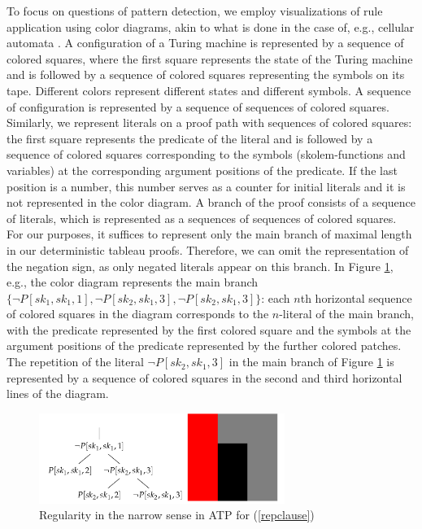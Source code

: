 \documentclass[%
  manuscript=article,   %
  year=2024,
  volume=77,
  doi=00000.000,
]{zfn}
\begin{document}
To focus on questions of pattern detection, we employ visualizations of rule application using color diagrams, akin to what is done in the case of, e.g., cellular automata \parencite[cf.][]{Wolfram}. 
A configuration of a Turing machine is represented by a sequence of colored squares, where the first square represents the state of the Turing machine and is followed by a sequence of colored squares representing the symbols on its tape. Different colors represent different states and different symbols. A sequence of configuration is represented by a sequence of sequences of colored squares. Similarly, we represent literals on a proof path with sequences of colored squares: the first square represents \label{colordia} the predicate of the literal and is followed by a sequence of colored squares corresponding to the symbols (skolem-functions and variables) at the corresponding argument positions of the predicate. If the last position is a number, this number serves as a counter for initial literals and it is not represented in the color diagram. A branch of the proof consists of a sequence of literals, which is represented as a sequences of sequences of colored squares. For our purposes, it suffices to represent only the main branch of maximal length in our deterministic tableau proofs. Therefore, we can omit the representation of the negation sign, as only negated literals appear on this branch. In Figure \ref{rep}, e.g., the color diagram represents the main branch $\{\neg P[sk_1,sk_1,1], \neg P[sk_2,sk_1,3], \neg P[sk_2,sk_1,3]\}$: each $n$th horizontal sequence 
of colored squares in the diagram corresponds to the $n$-literal of the main branch, with the predicate represented by the first colored square and the symbols at the argument positions of the predicate represented by the further colored patches. The repetition of the literal $\neg P[sk_2,sk_1,3]$ in the main branch of Figure \ref{rep} is represented by a sequence of colored squares in the second and third horizontal lines of the diagram.


\begin{figure}[ht]
\begin{center}
\includegraphics[width=8cm]{ART_Lampert/fig1.png}
\end{center}
\caption{Regularity in the narrow sense in ATP for (\ref{repclause})}
    \label{rep}
\end{figure}
\end{document}
